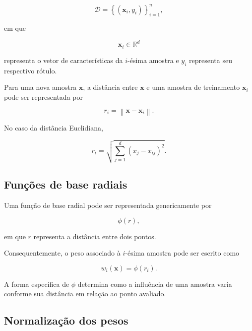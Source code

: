 \documentclass[12pt,a4paper]{article}
\newcommand{\R}{\mathbb{R}}
\newcommand{\norm}[1]{\left\lVert #1 \right\rVert}
\begin{document}
	\begin{equation}
		\mathcal{D}
		=
		\left\{
		(\mathbf{x}_i,y_i)
		\right\}_{i=1}^{n},
	\end{equation}
	
	em que
	
	\begin{equation}
		\mathbf{x}_i \in \R^d
	\end{equation}
	
	representa o vetor de características da $i$-ésima amostra e
	$y_i$ representa seu respectivo rótulo.
	
	Para uma nova amostra $\mathbf{x}$, a distância entre $\mathbf{x}$ e
	uma amostra de treinamento $\mathbf{x}_i$ pode ser representada por
	
	\begin{equation}
		r_i =
		\norm{\mathbf{x}-\mathbf{x}_i}.
	\end{equation}
	
	No caso da distância Euclidiana,
	
	\begin{equation}
		r_i =
		\sqrt{
			\sum_{j=1}^{d}
			(x_j-x_{ij})^2
		}.
	\end{equation}
	
	\subsection{Funções de base radiais}
	
	Uma função de base radial pode ser representada genericamente por
	
	\begin{equation}
		\phi(r),
	\end{equation}
	
	em que $r$ representa a distância entre dois pontos.
	
	Consequentemente, o peso associado à $i$-ésima amostra pode ser escrito
	como
	
	\begin{equation}
		w_i(\mathbf{x})
		=
		\phi(r_i).
	\end{equation}
	
	A forma específica de $\phi$ determina como a influência de uma amostra
	varia conforme sua distância em relação ao ponto avaliado.
	
	\subsection{Normalização dos pesos}
	
\end{document}
